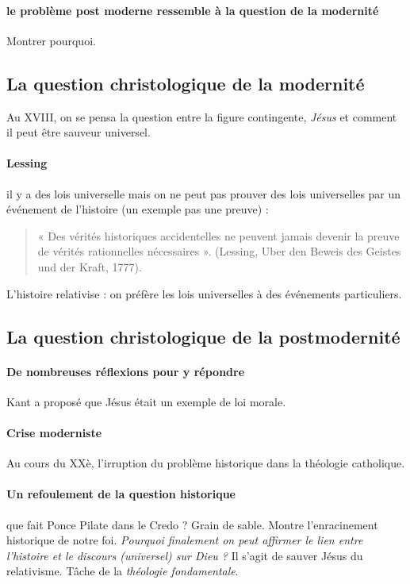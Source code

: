 \paragraph{le problème post moderne ressemble à la question de la modernité} Montrer pourquoi.


\subsection{La question christologique de la modernité} Au XVIII, on se pensa la question entre la figure contingente, \textit{Jésus} et comment il peut être sauveur universel.

\paragraph{Lessing } il y a des lois universelle mais on ne peut pas prouver des lois universelles par un événement de l'histoire (un exemple pas une preuve) : 
\begin{quote}
    « Des vérités historiques accidentelles ne peuvent jamais devenir la preuve de vérités
rationnelles nécessaires ». (Lessing, Uber den Beweis des Geistes und der Kraft, 1777).
\end{quote}

L'histoire relativise : on préfère les lois universelles à des événements particuliers. 




\subsection{La question christologique de la postmodernité}

 
\paragraph{De nombreuses réflexions pour y répondre} Kant a proposé que Jésus était un exemple de loi morale. 
\paragraph{Crise moderniste} Au cours du XXè, l'irruption du problème historique dans la théologie catholique.

\paragraph{Un refoulement de la question historique} que fait Ponce Pilate dans le Credo ? Grain de sable. Montre l'enracinement historique de notre foi. \textit{Pourquoi finalement on peut affirmer le lien entre l'histoire et le discours (universel) sur Dieu ?} Il s'agit de sauver Jésus du relativisme. Tâche de la \textit{théologie fondamentale}.

